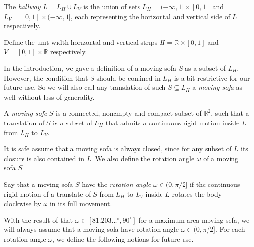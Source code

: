 \begin{definition}

The \emph{hallway} \(L = L_H \cup L_V\) is the union of sets \(L_H = (-\infty, 1] \times [0, 1]\) and \(L_V = [0, 1] \times (-\infty, 1]\), each representing the horizontal and vertical side of \(L\) respectively.

\label{def:hallway}
\end{definition}

\begin{definition}

Define the unit-width horizontal and vertical strips \(H = \mathbb{R} \times [0, 1]\) and \(V = [0, 1] \times \mathbb{R}\) respectively.

\label{def:strip}
\end{definition}

In the introduction, we gave a definition of a moving sofa \(S\) as a subset of \(L_H\). However, the condition that \(S\) should be confined in \(L_H\) is a bit restrictive for our future use. So we will also call any translation of such \(S \subseteq L_H\) a \emph{moving sofa} as well without loss of generality.

\begin{definition}

A \emph{moving sofa} \(S\) is a connected, nonempty and compact subset of \(\mathbb{R}^2\), such that a translation of \(S\) is a subset of \(L_H\) that admits a continuous rigid motion inside \(L\) from \(L_H\) to \(L_V\).

\label{def:sofa}
\end{definition}

It is safe assume that a moving sofa is always closed, since for any subset of \(L\) its closure is also contained in \(L\). We also define the rotation angle \(\omega\) of a moving sofa \(S\).

\begin{definition}

Say that a moving sofa \(S\) have the \emph{rotation angle} \(\omega \in (0, \pi/2]\) if the continuous rigid motion of a translate of \(S\) from \(L_H\) to \(L_V\) inside \(L\) rotates the body clockwise by \(\omega\) in its full movement.

\label{def:rotation-angle}
\end{definition}

With the result of \autocite{kallusImprovedUpperBounds2018} that \(\omega \in [81.203\dots^\circ, 90^\circ]\) for a maximum-area moving sofa, we will always assume that a moving sofa have rotation angle \(\omega \in (0, \pi/2]\). For each rotation angle \(\omega\), we define the following notions for future use.

